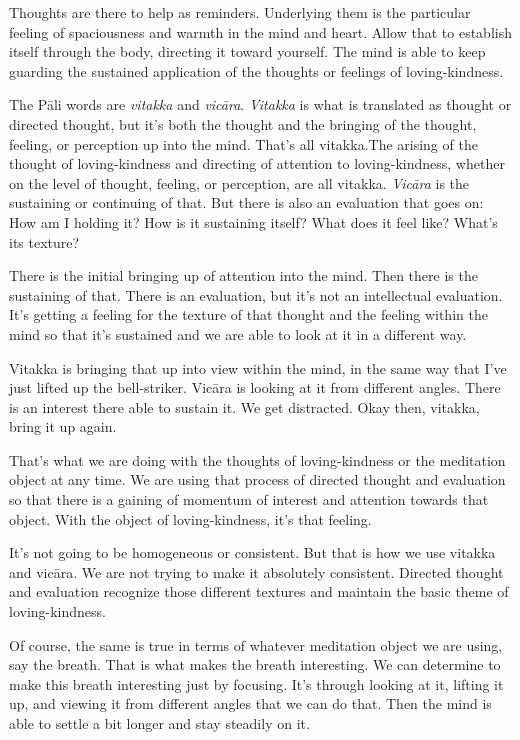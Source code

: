 Thoughts are there to help as reminders. Underlying them is the
particular feeling of spaciousness and warmth in the mind and heart.
Allow that to establish itself through the body, directing it toward
yourself. The mind is able to keep guarding the sustained application of
the thoughts or feelings of loving-kindness.

The Pāli words are \emph{vitakka} and \emph{vicāra}. \emph{Vitakka} is
what is translated as thought or directed thought, but it’s both the
thought and the bringing of the thought, feeling, or perception up into
the mind. That's all vitakka.The arising of the thought of
loving-kindness and directing of attention to loving-kindness, whether
on the level of thought, feeling, or perception, are all vitakka.
\emph{Vicāra} is the sustaining or continuing of that. But there is also
an evaluation that goes on: How am I holding it? How is it sustaining
itself? What does it feel like? What’s its texture?

There is the initial bringing up of attention into the mind. Then there
is the sustaining of that. There is an evaluation, but it’s not an
intellectual evaluation. It’s getting a feeling for the texture of that
thought and the feeling within the mind so that it’s sustained and we
are able to look at it in a different way.

Vitakka is bringing that up into view within the mind, in the same way
that I’ve just lifted up the bell-striker. Vicāra is looking at it from
different angles. There is an interest there able to sustain it. We get
distracted. Okay then, vitakka, bring it up again.

That’s what we are doing with the thoughts of loving-kindness or the
meditation object at any time. We are using that process of directed
thought and evaluation so that there is a gaining of momentum of
interest and attention towards that object. With the object of
loving-kindness, it’s that feeling.

It’s not going to be homogeneous or consistent. But that is how we use
vitakka and vicāra. We are not trying to make it absolutely consistent.
Directed thought and evaluation recognize those different textures and
maintain the basic theme of loving-kindness.

Of course, the same is true in terms of whatever meditation object we
are using, say the breath. That is what makes the breath interesting. We
can determine to make this breath interesting just by focusing. It’s
through looking at it, lifting it up, and viewing it from different
angles that we can do that. Then the mind is able to settle a bit longer
and stay steadily on it.

